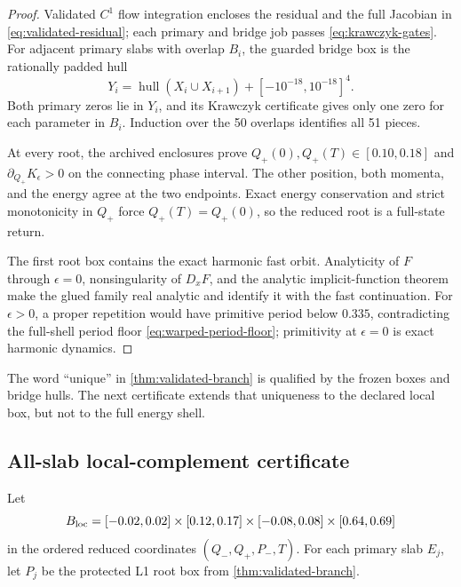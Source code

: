 \begin{proof}
Validated \(C^1\) flow integration encloses the residual and the full
Jacobian in \cref{eq:validated-residual}; each primary and bridge job passes
\cref{eq:krawczyk-gates}.  For adjacent primary slabs with overlap \(B_i\),
the guarded bridge box is the rationally padded hull
\begin{equation}
 Y_i=\operatorname{hull}(X_i\cup X_{i+1})
       +[-10^{-18},10^{-18}]^4.
 \label{eq:bridge-hull}
\end{equation}
Both primary zeros lie in \(Y_i\), and its Krawczyk certificate gives only
one zero for each parameter in \(B_i\).  Induction over the 50 overlaps
identifies all 51 pieces.

At every root, the archived enclosures prove
\(Q_+(0),Q_+(T)\in[0.10,0.18]\) and
\(\partial_{Q_+}K_\epsilon>0\) on the connecting phase interval.  The other
position, both momenta, and the energy agree at the two endpoints.  Exact
energy conservation and strict monotonicity in \(Q_+\) force
\(Q_+(T)=Q_+(0)\), so the reduced root is a full-state return.

The first root box contains the exact harmonic fast orbit.  Analyticity of
\(F\) through \(\epsilon=0\), nonsingularity of \(D_xF\), and the analytic
implicit-function theorem make the glued family real analytic and identify
it with the fast continuation.  For \(\epsilon>0\), a proper repetition
would have primitive period below \(0.335\), contradicting the full-shell
period floor \cref{eq:warped-period-floor}; primitivity at
\(\epsilon=0\) is exact harmonic dynamics.
\end{proof}

The word ``unique'' in \cref{thm:validated-branch} is qualified by the frozen
boxes and bridge hulls.  The next certificate extends that uniqueness to the
declared local box, but not to the full energy shell.

\subsection{All-slab local-complement certificate}

Let
\begin{equation}
 B_{\rm loc}=[-0.02,0.02]\times[0.12,0.17]\times[-0.08,0.08]
 \times[0.64,0.69]
 \label{eq:local-complement-box}
\end{equation}
in the ordered reduced coordinates
\((Q_-,Q_+,P_-,T)\).  For each primary slab \(E_j\), let \(P_j\) be the
protected L1 root box from \cref{thm:validated-branch}.

